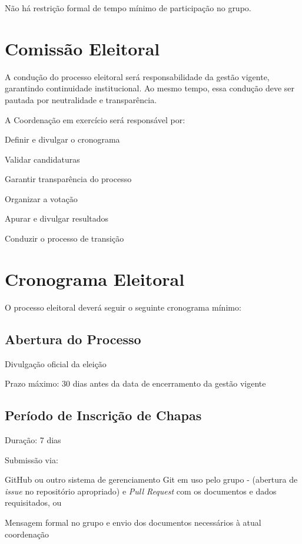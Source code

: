 \documentclass[
  12pt,          %
  a4paper,       %
  oneside,       %
  brazil         %
]{article}
\begin{document}
Não há restrição formal de tempo mínimo de participação no grupo.

\section{Comissão Eleitoral}

A condução do processo eleitoral será responsabilidade da gestão vigente, garantindo continuidade institucional. 
Ao mesmo tempo, essa condução deve ser pautada por neutralidade e transparência.

A Coordenação em exercício será responsável por:

\begin{conduta}
	\item Definir e divulgar o cronograma
	\item Validar candidaturas
	\item Garantir transparência do processo
	\item Organizar a votação
	\item Apurar e divulgar resultados
	\item Conduzir o processo de transição
\end{conduta}

\section{Cronograma Eleitoral}

O processo eleitoral deverá seguir o seguinte cronograma mínimo:

\subsection{Abertura do Processo}

\begin{conduta}
	\item Divulgação oficial da eleição
	\item Prazo máximo: 30 dias antes da data de encerramento da gestão vigente
\end{conduta}

\subsection{Período de Inscrição de Chapas}

\begin{conduta}
	\item Duração: 7 dias
	\item Submissão via:
	\begin{conduta}
		\item GitHub ou outro sistema de gerenciamento Git em uso pelo grupo - (abertura de \textit{issue} no repositório apropriado) e \textit{Pull Request} com os documentos e dados requisitados, ou
		\item Mensagem formal no grupo e envio dos documentos necessários à atual coordenação
	\end{conduta}
\end{conduta}
\end{document}
